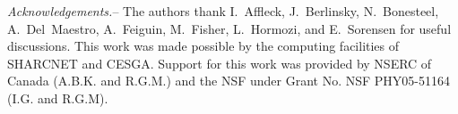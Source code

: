 \documentclass[prl,aps,twocolumn,floatfix,amsmath,amssymb,superscriptaddress,tightenlines]{revtex4}
\begin{document}

{\it Acknowledgements.}-- The authors thank I.~Affleck, J.~Berlinsky,
N.~Bonesteel,
A.~Del~Maestro, A.~Feiguin, M.~Fisher, L.~Hormozi, and E.~Sorensen for useful
discussions.  This work was made possible by the computing facilities of
SHARCNET and CESGA.  Support for this work was provided by NSERC of
Canada (A.B.K. and R.G.M.) and the NSF under Grant No. NSF PHY05-51164 (I.G. and R.G.M).


\end{document}
